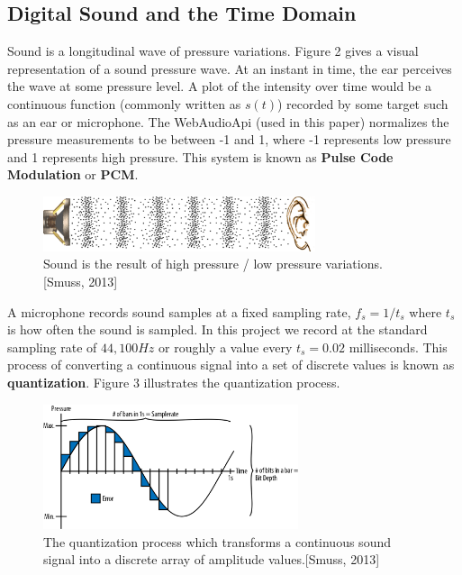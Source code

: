 \documentclass[DIV=calc, paper=a4, fontsize=11pt, twocolumn]{scrartcl}   %
\begin{document}
\subsection{Digital Sound and the Time Domain}
Sound is a longitudinal wave of pressure variations. Figure 2 gives a visual representation of a sound pressure wave. At an instant in time, the ear perceives the wave at some pressure level. A plot of the intensity over time would be a continuous function (commonly written as $s(t)$) recorded by some target such as an ear or microphone. The WebAudioApi (used in this paper) normalizes the pressure measurements to be between -1 and 1, where -1 represents low pressure and 1 represents high pressure. This system is known as \textbf{Pulse Code Modulation} or \textbf{PCM}.

\begin{figure}[h]
\centering
\includegraphics[width=80mm]{figures/pressure_wave.png}
\caption{Sound is the result of high pressure / low pressure variations. [Smuss, 2013]}
\label{overflow}
\end{figure}

\par A microphone records sound samples at a fixed sampling rate, $ f_s = 1/t_s $ where $t_s$ is how often the sound is sampled. In this project we record at the standard sampling rate of
 $44,100Hz$ or roughly a value every $t_s =0.02$ milliseconds. This process of converting a continuous signal into a set of discrete values is known as \textbf{quantization}. Figure 3 illustrates the quantization process.

 \begin{figure}[h]
\centering
\includegraphics[width=75mm]{figures/quantization.png}
\caption{The quantization process which transforms a continuous sound signal into a discrete array of amplitude values.[Smuss, 2013]}
\label{overflow}
\end{figure}
\end{document}

